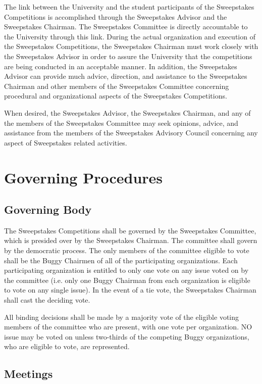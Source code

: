 The link between the University and the student participants of the Sweepstakes Competitions is accomplished through the Sweepstakes Advisor and the Sweepstakes Chairman. The Sweepstakes Committee is directly accountable to the University through this link. During the actual organization and execution of the Sweepstakes Competitions, the Sweepstakes Chairman must work closely with the Sweepstakes Advisor in order to assure the University that the competitions are being conducted in an acceptable manner. In addition, the Sweepstakes Advisor can provide much advice, direction, and assistance to the Sweepstakes Chairman and other members of the Sweepstakes Committee concerning procedural and organizational aspects of the Sweepstakes Competitions.

When desired, the Sweepstakes Advisor, the Sweepstakes Chairman, and any of the members of the Sweepstakes Committee may seek opinions, advice, and assistance from the members of the Sweepstakes Advisory Council concerning any aspect of Sweepstakes related activities.

\section{Governing Procedures}

\subsection{Governing Body}

The Sweepstakes Competitions shall be governed by the Sweepstakes Committee, which is presided over by the Sweepstakes Chairman. The committee shall govern by the democratic process. The only members of the committee eligible to vote shall be the Buggy Chairmen of all of the participating organizations. Each participating organization is entitled to only one vote on any issue voted on by the committee (i.e. only one Buggy Chairman from each organization is eligible to vote on any single issue). In the event of a tie vote, the Sweepstakes Chairman shall cast the deciding vote.

All binding decisions shall be made by a majority vote of the eligible voting members of the committee who are present, with one vote per organization. NO issue may be voted on unless two-thirds of the competing Buggy organizations, who are eligible to vote, are represented.

\subsection{Meetings}


